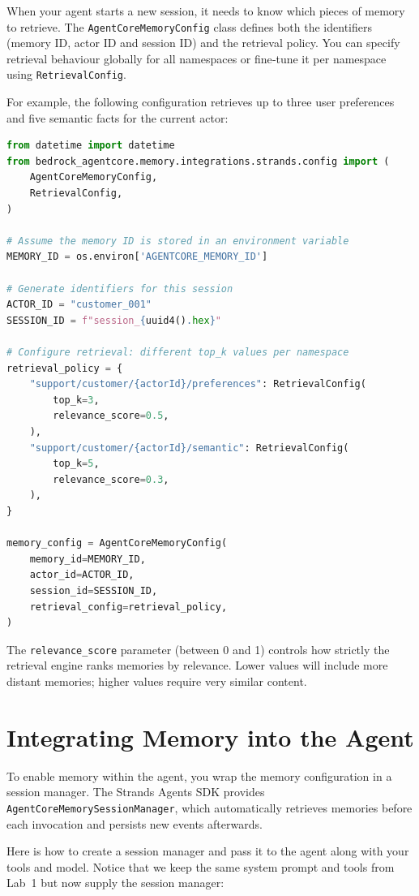 When your agent starts a new session, it needs to know which pieces of
memory to retrieve.  The \texttt{AgentCoreMemoryConfig} class defines
both the identifiers (memory ID, actor ID and session ID) and the
retrieval policy.  You can specify retrieval behaviour globally for all
namespaces or fine‑tune it per namespace using \texttt{RetrievalConfig}.

For example, the following configuration retrieves up to three user
preferences and five semantic facts for the current actor:

\begin{lstlisting}[language=Python]
from datetime import datetime
from bedrock_agentcore.memory.integrations.strands.config import (
    AgentCoreMemoryConfig,
    RetrievalConfig,
)

# Assume the memory ID is stored in an environment variable
MEMORY_ID = os.environ['AGENTCORE_MEMORY_ID']

# Generate identifiers for this session
ACTOR_ID = "customer_001"
SESSION_ID = f"session_{uuid4().hex}"

# Configure retrieval: different top_k values per namespace
retrieval_policy = {
    "support/customer/{actorId}/preferences": RetrievalConfig(
        top_k=3,
        relevance_score=0.5,
    ),
    "support/customer/{actorId}/semantic": RetrievalConfig(
        top_k=5,
        relevance_score=0.3,
    ),
}

memory_config = AgentCoreMemoryConfig(
    memory_id=MEMORY_ID,
    actor_id=ACTOR_ID,
    session_id=SESSION_ID,
    retrieval_config=retrieval_policy,
)
\end{lstlisting}

The \texttt{relevance\_score} parameter (between 0 and 1) controls how
strictly the retrieval engine ranks memories by relevance.  Lower values
will include more distant memories; higher values require very similar
content.

\section{Integrating Memory into the Agent}

To enable memory within the agent, you wrap the memory configuration in a
session manager.  The Strands Agents SDK provides
\texttt{AgentCoreMemorySessionManager}, which automatically retrieves
memories before each invocation and persists new events afterwards.

Here is how to create a session manager and pass it to the agent along
with your tools and model.  Notice that we keep the same system prompt
and tools from Lab 1 but now supply the session manager:

